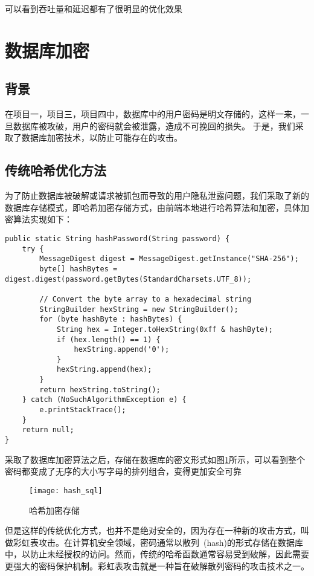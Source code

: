 可以看到吞吐量和延迟都有了很明显的优化效果

\section{数据库加密}

\subsection{背景}
在项目一，项目三，项目四中，数据库中的用户密码是明文存储的，这样一来，一旦数据库被攻破，用户的密码就会被泄露，造成不可挽回的损失。
于是，我们采取了数据库加密技术，以防止可能存在的攻击。

\subsection{传统哈希优化方法}
为了防止数据库被破解或请求被抓包而导致的用户隐私泄露问题，我们采取了新的数据库存储模式，即哈希加密存储方式，由前端本地进行哈希算法和加密，具体加密算法实现如下：

\begin{lstlisting}[basicstyle=\footnotesize]
public static String hashPassword(String password) {
	try {
		MessageDigest digest = MessageDigest.getInstance("SHA-256");
		byte[] hashBytes = digest.digest(password.getBytes(StandardCharsets.UTF_8));

		// Convert the byte array to a hexadecimal string
		StringBuilder hexString = new StringBuilder();
		for (byte hashByte : hashBytes) {
			String hex = Integer.toHexString(0xff & hashByte);
			if (hex.length() == 1) {
				hexString.append('0');
			}
			hexString.append(hex);
		}
		return hexString.toString();
	} catch (NoSuchAlgorithmException e) {
		e.printStackTrace();
	}
	return null;
}
\end{lstlisting}

采取了数据库加密算法之后，存储在数据库的密文形式如图\ref{fig:hash_sql}所示，可以看到整个密码都变成了无序的大小写字母的排列组合，变得更加安全可靠

\begin{figure}[htbp]
	\centering
	\texttt{[image: hash\_sql]}
	\caption{哈希加密存储}
	\label{fig:hash_sql}
	\vspace{\baselineskip}
\end{figure}

但是这样的传统优化方式，也并不是绝对安全的，因为存在一种新的攻击方式，叫做彩虹表攻击。在计算机安全领域，密码通常以散列~(hash)的形式存储在数据库中，以防止未经授权的访问。然而，传统的哈希函数通常容易受到破解，因此需要更强大的密码保护机制。彩虹表攻击就是一种旨在破解散列密码的攻击技术之一。

